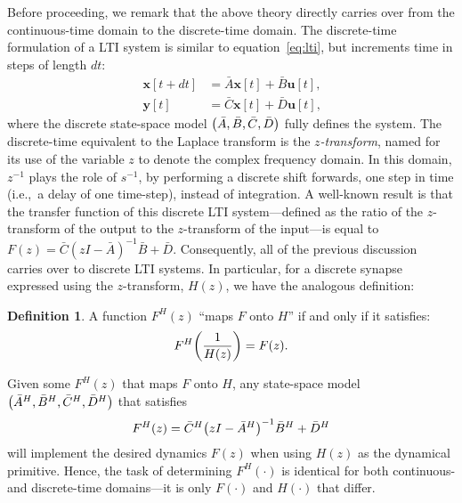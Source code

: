 \documentclass[12pt]{article}
\theoremstyle{definition}
\newtheorem{definition}{Definition}[section]
\renewcommand{\vec}{\mathbf}  %
\let\originalleft\left
\let\originalright\right
\renewcommand{\left}{\mathopen{}\mathclose\bgroup\originalleft}
\renewcommand{\right}{\aftergroup\egroup\originalright}
\begin{document}
Before proceeding, we remark that the above theory directly carries over from the continuous-time domain to the discrete-time domain.
The discrete-time formulation of a LTI system is similar to equation~\ref{eq:lti}, but increments time in steps of length $dt$:
\begin{equation} \label{eq:dlti}
\begin{split}
\vec{x}[t+dt] &= \bar{A}\vec{x}[t] + \bar{B}\vec{u}[t] \text{,} \\
\vec{y}[t] &= \bar{C}\vec{x}[t] + \bar{D}\vec{u}[t] \text{,}
\end{split}
\end{equation}
where the discrete state-space model $\left( \bar{A}\text{,}\, \bar{B}\text{,}\, \bar{C}\text{,}\, \bar{D} \right)$ fully defines the system.
The discrete-time equivalent to the Laplace transform is the $z$\emph{-transform}, named for its use of the variable $z$ to denote the complex frequency domain.
In this domain, $z^{-1}$ plays the role of $s^{-1}$, by performing a discrete shift forwards, one step in time (i.e.,~a delay of one time-step), instead of integration.
A well-known result is that the transfer function of this discrete LTI system---defined as the ratio of the $z$-transform of the output to the $z$-transform of the input---is equal to $F(z) = \bar{C} (zI - \bar{A})^{-1} \bar{B} + \bar{D}$.
Consequently, all of the previous discussion carries over to discrete LTI systems.
In particular, for a discrete synapse expressed using the $z$-transform, $H(z)$, we have the analogous definition:
\begin{definition} \label{def:discrete-maps-onto}
A function $F^{H}(z)$ ``maps $F$ onto $H$'' if and only if it satisfies:
\begin{align} \label{eq:discrete-maps-onto}
F^{H}\left( \frac{1}{H(z)} \right) = F(z) \text{.}
\end{align}
\end{definition}
Given some $F^{H}(z)$ that maps $F$ onto $H$, any state-space model $\left( \bar{A}^H\text{,}\, \bar{B}^H\text{,}\, \bar{C}^H\text{,}\, \bar{D}^H \right)$ that satisfies
\begin{equation} \label{eq:dss-mapped}
F^{H} \left( z \right) = \bar{C}^H \left( zI - \bar{A}^H \right)^{-1}\bar{B}^H + \bar{D}^H
\end{equation}
will implement the desired dynamics $F(z)$ when using $H(z)$ as the dynamical primitive.
Hence, the task of determining $F^{H}(\cdot)$ is identical for both continuous- and discrete-time domains---it is only $F(\cdot)$ and $H(\cdot)$ that differ.
\end{document}
